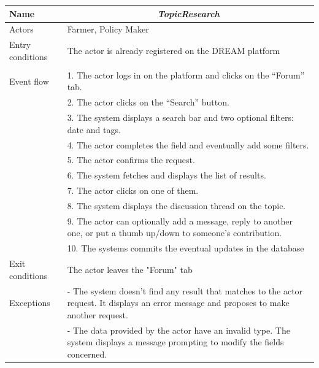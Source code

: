 \begin{table}[htbp]
	\centering
	\begin{tabularx}{\linewidth}{|l|X|}
		\hline
		Name & \multicolumn{1}{c|}{\textit{\textbf{TopicResearch}}}                                                   \tabularnewline \hline
		Actors                                               & Farmer, Policy Maker                                                   \tabularnewline \hline
		Entry conditions                                              & The actor is already registered on the DREAM platform
		\tabularnewline
		&
		\tabularnewline \hline
		Event flow                                         & 1.	The actor logs in on the platform and clicks on the “Forum” tab.                                           \tabularnewline 
		& 2.	The actor clicks on the “Search” button.                                           \tabularnewline 
		& 3.	The system displays a search bar and two optional filters: date and tags.                                           \tabularnewline 
		& 4.	The actor completes the field and eventually add some filters.                                    \tabularnewline
		& 5.	The actor confirms the request.                                           \tabularnewline
		& 6.	The system fetches and displays the list of results.                                     \tabularnewline
		& 7.	The actor clicks on one of them.                                \tabularnewline
		& 8.	The system displays the discussion thread on the topic.                              \tabularnewline
		& 9.	The actor can optionally add a message, reply to another one, or put a thumb up/down to someone’s contribution. 
		\tabularnewline
		& 10.	The systems commits the eventual updates in the database                             \tabularnewline \hline
		Exit conditions 
		& The actor leaves the "Forum" tab
		\tabularnewline \hline
		Exceptions 
		& -	The system doesn’t find any result that matches to the actor request. It displays an error message and proposes to make another request.
		\tabularnewline
		& -	The data provided by the actor have an invalid type. The system displays a message prompting  to modify the fields concerned.
		\tabularnewline
		\hline
	\end{tabularx}   
\end{table}


